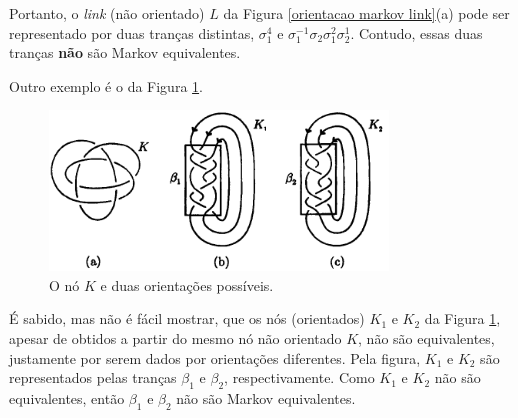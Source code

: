 \begin{remark}
		\par\vspace{0.3cm} Portanto, o \textit{link} (não orientado) $L$ da 
		Figura \ref{orientacao markov link}(a) pode ser representado por duas tranças distintas, 
		$\sigma_1^4$ e $\sigma_1^{-1}\sigma_2\sigma_1^{2}\sigma_2^{1}$. Contudo, essas duas 
		tranças \textbf{não} são Markov equivalentes.
		
		\par\vspace{0.3cm} Outro exemplo é o da Figura \ref{orientacao markov no}.
		\begin{figure}[H]
			\begin{center}
				\includegraphics[width=9cm]{Images/orientacao_markov_no.png}
			\end{center}\caption{O nó $K$ e duas orientações possíveis.}\label{orientacao markov no}
		\end{figure}
		É sabido, mas não é fácil mostrar, que os nós (orientados) $K_1$ e $K_2$ da 
		Figura \ref{orientacao markov no}, apesar de obtidos a partir do mesmo nó não 
		orientado $K$, não são equivalentes, justamente por serem dados por orientações 
		diferentes. Pela figura, $K_1$ e $K_2$ são representados pelas tranças $\beta_1$ e $\beta_2$,
		respectivamente. Como $K_1$ e $K_2$ não são equivalentes, então $\beta_1$ e $\beta_2$ 
		não são Markov equivalentes.  
	\end{remark}
